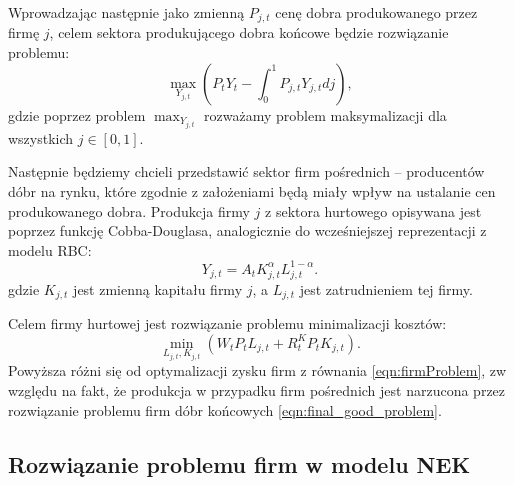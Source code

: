 Wprowadzając następnie jako zmienną $P_{j,t}$ cenę dobra produkowanego przez firmę $j$, celem sektora produkującego dobra końcowe będzie rozwiązanie problemu:
\begin{equation}
    \label{eqn:final_good_problem}
    \max_{Y_{j,t}} \left(P_t Y_t - \int_0^1P_{j,t}Y_{j,t} dj\right),
\end{equation}
gdzie poprzez problem $\max_{Y_{j,t}}$ rozważamy problem maksymalizacji dla wszystkich $j \in [0,1]$.

Następnie będziemy chcieli przedstawić sektor firm pośrednich -- producentów dóbr na rynku, które zgodnie z założeniami  będą miały wpływ na ustalanie cen produkowanego dobra. Produkcja firmy $j$ z sektora hurtowego opisywana jest poprzez funkcję Cobba-Douglasa, analogicznie do wcześniejszej reprezentacji z modelu RBC:
\begin{equation}
    \label{eqn:wholesale_condition}
    Y_{j,t} = A_t K_{j,t}^\alpha L_{j,t}^{1-\alpha}.
\end{equation}
gdzie $K_{j,t}$ jest zmienną kapitału firmy $j$, a $L_{j,t}$ jest zatrudnieniem tej firmy. 

Celem firmy hurtowej jest rozwiązanie problemu minimalizacji kosztów:
\begin{equation}
    \label{eqn:wholesale_problem}
    \min_{L_{j,t},K_{j,t}} \left(W_t P_t L_{j,t} + R^K_t P_t K_{j,t}\right).
\end{equation}
Powyższa różni się od optymalizacji zysku firm z równania \eqref{eqn:firmProblem}, zw względu na fakt, że produkcja w przypadku firm pośrednich jest narzucona przez rozwiązanie problemu firm dóbr końcowych \eqref{eqn:final_good_problem}.

\subsection{Rozwiązanie problemu firm w modelu NEK}
\label{sec:firms_nek_solve}

